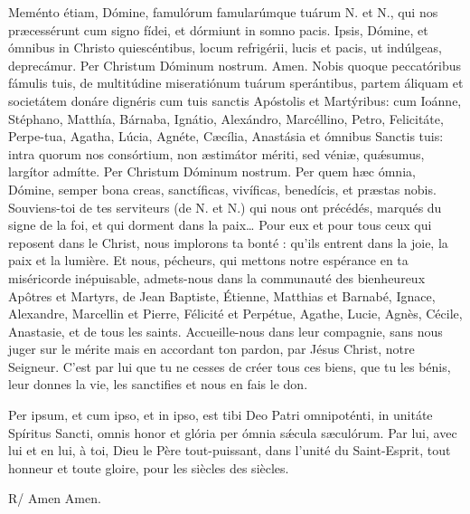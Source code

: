 \begin{paracol}{2}
\LigneParacol
{Meménto étiam, Dómine, famulórum famularúmque tuárum N. et N., qui nos præcessérunt cum signo fídei, et dórmiunt in somno pacis. Ipsis, Dómine, et ómnibus in Christo quiescéntibus, locum refrigérii, lucis et pacis, ut indúlgeas, deprecámur. Per Christum Dóminum nostrum. Amen. Nobis quoque peccatóribus fámulis tuis, de multitúdine miseratiónum tuárum sperántibus, partem áliquam et societátem donáre dignéris cum tuis sanctis Apóstolis et Martýribus: cum Ioánne, Stéphano, Matthía, Bárnaba, Ignátio, Alexándro, Marcéllino, Petro, Felicitáte, Perpe-tua, Agatha, Lúcia, Agnéte, Cæcília, Anastásia et ómnibus Sanctis tuis: intra quorum nos consórtium, non æstimátor mériti, sed véniæ, quǽsumus, largítor admítte. Per Christum Dóminum nostrum. Per quem hæc ómnia, Dómine, semper bona creas, sanctíficas, vivíficas, benedícis, et præstas nobis.}
{Souviens-toi de tes serviteurs (de N. et N.) qui nous ont précédés, marqués du signe de la foi, et qui dorment dans la paix… Pour eux et pour tous ceux qui reposent dans le Christ, nous implorons ta bonté : qu'ils entrent dans la joie, la paix et la lumière. Et nous, pécheurs, qui mettons notre espérance en ta miséricorde inépuisable, admets-nous dans la communauté des bienheureux Apôtres et Martyrs, de Jean Baptiste, Étienne, Matthias et Barnabé, Ignace, Alexandre, Marcellin et Pierre, Félicité et Perpétue, Agathe, Lucie, Agnès, Cécile, Anastasie, et de tous les saints. Accueille-nous dans leur compagnie, sans nous juger sur le mérite mais en accordant ton pardon, par Jésus Christ, notre Seigneur. C'est par lui que tu ne cesses de créer tous ces biens, que tu les bénis, leur donnes la vie, les sanctifies et nous en fais le don.}

\LigneParacol
{Per ipsum, et cum ipso, et in ipso, est tibi Deo Patri omnipoténti, in unitáte Spíritus Sancti, omnis honor et glória per ómnia sǽcula sæculórum.}
{Par lui, avec lui et en lui, à toi, Dieu le Père tout-puissant, dans l'unité du Saint-Esprit, tout honneur et toute gloire, pour les siècles des siècles.}

\LigneParacol
{R/ Amen}
{Amen.}

\end{paracol}
